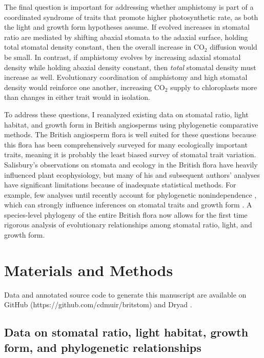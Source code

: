 \documentclass[12pt, oneside]{article}
\begin{document}
The final question is important for addressing whether amphistomy is part of a coordinated syndrome of traits that promote higher photosynthetic rate, as both the light and growth form hypotheses assume. If evolved increases in stomatal ratio are mediated by shifting abaxial stomata to the adaxial surface, holding total stomatal density constant, then the overall increase in CO$_2$ diffusion would be small. In contrast, if amphistomy evolves by increasing adaxial stomatal density while holding abaxial density constant, then \textit{total} stomatal density must increase as well. Evolutionary coordination of amphistomy and high stomatal density would reinforce one another, increasing CO$_2$ supply to chloroplasts more than changes in either trait would in isolation.

To address these questions, I reanalyzed existing data on stomatal ratio, light habitat, and growth form in British angiosperms \citep{Salisbury_1927, Fitter_Peat_1994a, BEF} using phylogenetic comparative methods. The British angiosperm flora is well suited for these questions because this flora has been comprehensively surveyed for many ecologically important traits, meaning it is probably the least biased survey of stomatal trait variation. Salisbury's observations on stomata and ecology in the British flora have heavily influenced plant ecophysiology, but many of his and subsequent authors' analyses have significant limitations because of inadequate statistical methods. For example, few analyses until recently account for phylogenetic nonindependence \citep{Felsenstein_1985}, which can strongly influence inferences on stomatal traits and growth form \citep[this study did not consider light]{Kelly_Beerling_1995}. A species-level phylogeny of the entire British flora \citep{Lim_etal_2014} now allows for the first time rigorous analysis of evolutionary relationships among stomatal ratio, light, and growth form. 


\section*{Materials and Methods}

Data and annotated source code to generate this manuscript are available on GitHub (https://github.com/cdmuir/britstom) and Dryad \citep{Muir_dryad}.

\subsection*{Data on stomatal ratio, light habitat, growth form, and phylogenetic relationships}
\end{document}

